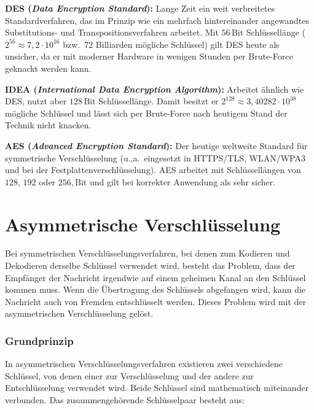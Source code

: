 \begin{compactitem}
\item \textbf{DES (\emph{Data Encryption Standard}):} Lange Zeit ein weit
verbreitetes Standardverfahren, das im Prinzip wie ein mehrfach
hintereinander angewandtes Substitutions- und Transpositionsverfahren arbeitet.
Mit $56\,\text{Bit}$ Schlüssellänge ($2^{56} \approx 7{,}2 \cdot 10^{16}$ bzw.\
$72$ Billiarden mögliche Schlüssel) gilt DES heute als unsicher, da er mit
moderner Hardware in wenigen Stunden per Brute-Force geknackt werden kann.

\item \textbf{IDEA (\emph{International Data Encryption Algorithm}):} Arbeitet
ähnlich wie DES, nutzt aber $128\,\text{Bit}$ Schlüssellänge. Damit besitzt er
$2^{128} \approx 3{,}40282 \cdot 10^{38}$ mögliche Schlüssel und lässt sich
per Brute-Force nach heutigem Stand der Technik nicht knacken.
\item \textbf{AES (\emph{Advanced Encryption Standard}):} Der heutige weltweite
Standard für symmetrische Verschlüsselung (u.,a.\ eingesetzt in HTTPS/TLS,
WLAN/WPA3 und bei der Festplattenverschlüsselung). AES arbeitet mit
Schlüssellängen von $128$, $192$ oder $256,\text{Bit}$ und gilt bei
korrekter Anwendung als sehr sicher.
\end{compactitem}

\section{Asymmetrische Verschlüsselung}

Bei symmetrischen Verschlüsselungsverfahren, bei denen zum Kodieren und
Dekodieren derselbe Schlüssel verwendet wird, besteht das Problem, dass der
Empfänger der Nachricht irgendwie auf einem geheimen Kanal an den Schlüssel
kommen muss. Wenn die Übertragung des Schlüssels abgefangen wird, kann die
Nachricht auch von Fremden entschlüsselt werden. Dieses Problem wird mit der
asymmetrischen Verschlüsselung gelöst.

\subsubsection{Grundprinzip}

In asymmetrischen Verschlüsselungsverfahren existieren zwei verschiedene
Schlüssel, von denen einer zur Verschlüsselung und der andere zur
Entschlüsselung verwendet wird. Beide Schlüssel sind mathematisch miteinander
verbunden. Das zusammengehörende Schlüsselpaar besteht aus:

